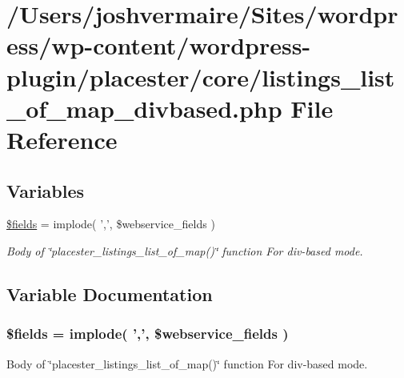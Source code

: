 \hypertarget{listings__list__of__map__divbased_8php}{
\section{/Users/joshvermaire/Sites/wordpress/wp-\/content/wordpress-\/plugin/placester/core/listings\_\-list\_\-of\_\-map\_\-divbased.php File Reference}
\label{d8/dab/listings__list__of__map__divbased_8php}
}
\subsection*{Variables}
\begin{DoxyCompactItemize}
\item 
\hyperlink{listings__list__of__map__divbased_8php_ab2303c817e3b402b77b7f99627b9c319}{\$fields} = implode( ',', \$webservice\_\-fields )
\begin{DoxyCompactList}\small\item\em Body of \char`\"{}placester\_\-listings\_\-list\_\-of\_\-map()\char`\"{} function For div-\/based mode. \end{DoxyCompactList}\end{DoxyCompactItemize}


\subsection{Variable Documentation}
\hypertarget{listings__list__of__map__divbased_8php_ab2303c817e3b402b77b7f99627b9c319}{
\subsubsection[{\$fields}]{\setlength{\rightskip}{0pt plus 5cm}\$fields = implode( ',', \$webservice\_\-fields )}}
\label{d8/dab/listings__list__of__map__divbased_8php_ab2303c817e3b402b77b7f99627b9c319}


Body of \char`\"{}placester\_\-listings\_\-list\_\-of\_\-map()\char`\"{} function For div-\/based mode. 

